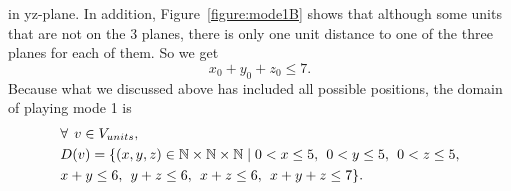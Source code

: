 in yz-plane. In addition, Figure~\ref{figure:mode1B} shows that although some units that are not on the 3 planes, there is only one unit distance to one of the three planes for each of them. So we get
\begin{equation}
x_{0}+y_{0}+z_{0}\leq7.
\end{equation}
Because what we discussed above has included all possible positions, the domain of playing mode 1 is
\begin{equation}
\begin{aligned}
&\forall \hspace{1ex} v \in V_{units},\\
&D(v)=\{(x,y,z) \in \mathbb{N} \times \mathbb{N}	\times \mathbb{N} \mid  0<x \leq 5, \hspace{1ex} 0<y \leq 5,\hspace{1ex} 0<z \leq 5,\\ &x+y\leq 6,\hspace{1ex} y+z\leq 6,\hspace{1ex}x+z\leq 6,\hspace{1ex}x+y+z\leq 7\}.
\end{aligned}
\end{equation}
